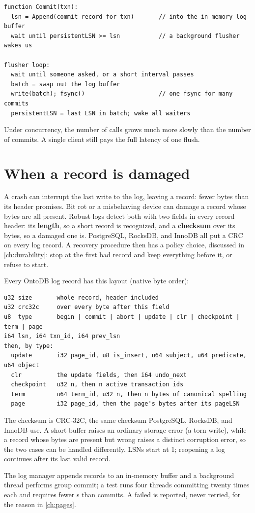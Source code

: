 \begin{lstlisting}[language=pseudo]
function Commit(txn):
  lsn = Append(commit record for txn)       // into the in-memory log buffer
  wait until persistentLSN >= lsn           // a background flusher wakes us

flusher loop:
  wait until someone asked, or a short interval passes
  batch = swap out the log buffer
  write(batch); fsync()                     // one fsync for many commits
  persistentLSN = last LSN in batch; wake all waiters
\end{lstlisting}

Under concurrency, the number of  calls grows much more slowly than
the number of commits. A single client still pays the full latency of one flush.

\section{When a record is damaged}

A crash can interrupt the last write to the log, leaving a  record:
fewer bytes than its header promises. Bit rot or a misbehaving device can damage
a record whose bytes are all present. Robust logs detect both with two fields in
every record header: its \textbf{length}, so a short record is recognized, and a
\textbf{checksum} over its bytes, so a damaged one is. PostgreSQL, RocksDB, and
InnoDB all put a CRC on every log record. A recovery procedure then has a
policy choice, discussed in \cref{ch:durability}: stop at the first bad record
and keep everything before it, or refuse to start.

\begin{ontodb}
Every OntoDB log record has this layout (native byte order):

\begin{lstlisting}
u32 size       whole record, header included
u32 crc32c     over every byte after this field
u8  type       begin | commit | abort | update | clr | checkpoint | term | page
i64 lsn, i64 txn_id, i64 prev_lsn
then, by type:
  update       i32 page_id, u8 is_insert, u64 subject, u64 predicate, u64 object
  clr          the update fields, then i64 undo_next
  checkpoint   u32 n, then n active transaction ids
  term         u64 term_id, u32 n, then n bytes of canonical spelling
  page         i32 page_id, then the page's bytes after its pageLSN
\end{lstlisting}

The checksum is CRC-32C, the same checksum PostgreSQL, RocksDB, and InnoDB use.
A short buffer raises an ordinary storage error (a torn write), while a record
whose bytes are present but wrong raises a distinct corruption error, so the two
cases can be handled differently. LSNs start at 1; reopening a log continues
after its last valid record.

The log manager appends records to an in-memory buffer and a background thread
performs group commit; a test runs four threads committing twenty times each and
requires fewer s than commits. A failed  is reported,
never retried, for the reason in \cref{ch:pages}.
\end{ontodb}

